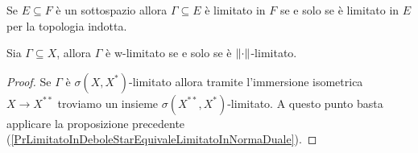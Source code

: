 \begin{remark}
Se $E\subseteq F$ \`e un sottospazio allora $\Gamma\subseteq E$ \`e limitato in $F$ se e solo se \`e limitato in $E$ per la topologia indotta.
\end{remark}

\begin{proposition}
Sia $\Gamma\subseteq X$, allora $\Gamma$ \`e w-limitato se e solo se \`e ${\left\Vert{\cdot}\right\Vert}$-limitato.
\end{proposition}
\begin{proof}
Se $\Gamma$ \`e $\sigma(X,X^\ast)$-limitato allora tramite l'immersione isometrica $X\to X^{\ast\ast}$ troviamo un insieme $\sigma(X^{\ast\ast},X^\ast)$-limitato. A questo punto basta applicare la proposizione precedente (\ref{PrLimitatoInDeboleStarEquivaleLimitatoInNormaDuale}).
\end{proof}
